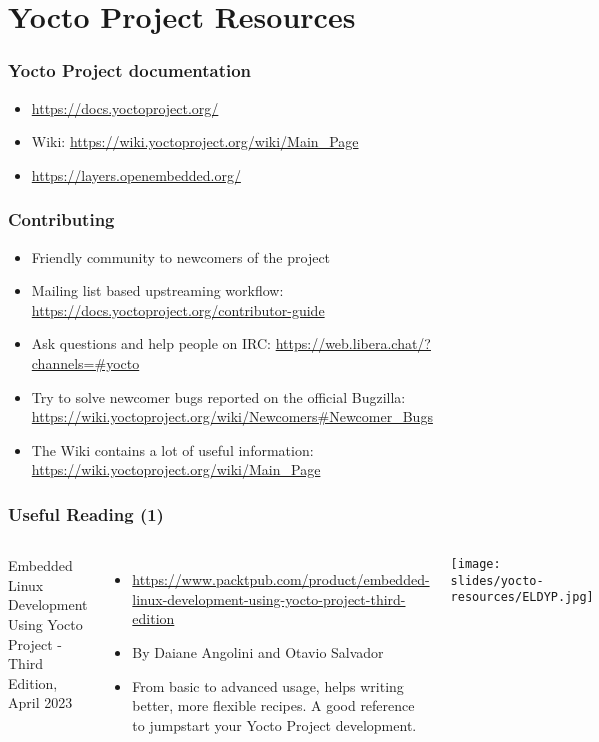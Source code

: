 \section{Yocto Project Resources}

\begin{frame}
  \frametitle{Yocto Project documentation}
  \begin{itemize}
  \item \url{https://docs.yoctoproject.org/}
  \item Wiki: \url{https://wiki.yoctoproject.org/wiki/Main_Page}
  \item \url{https://layers.openembedded.org/}
  \end{itemize}
\end{frame}

\begin{frame}
  \frametitle{Contributing}
  \begin{itemize}
    \item Friendly community to newcomers of the project
    \item Mailing list based upstreaming workflow:
      \url{https://docs.yoctoproject.org/contributor-guide}
    \item Ask questions and help people on IRC:
      \url{https://web.libera.chat/?channels=\#yocto}
    \item Try to solve newcomer bugs reported on the official Bugzilla:
      \url{https://wiki.yoctoproject.org/wiki/Newcomers\#Newcomer_Bugs}
    \item The Wiki contains a lot of useful information:
      \url{https://wiki.yoctoproject.org/wiki/Main_Page}
  \end{itemize}
\end{frame}

\begin{frame}
  \frametitle{Useful Reading (1)}
  \begin{columns}
    Embedded Linux Development Using Yocto Project - Third Edition, April 2023
    \begin{itemize}
    \item \url{https://www.packtpub.com/product/embedded-linux-development-using-yocto-project-third-edition}
    \item By Daiane Angolini and Otavio Salvador
    \item From basic to advanced usage, helps writing better, more
      flexible recipes. A good reference to jumpstart your Yocto
      Project development.
    \end{itemize}
    \texttt{[image: slides/yocto-resources/ELDYP.jpg]}
  \end{columns}
\end{frame}

